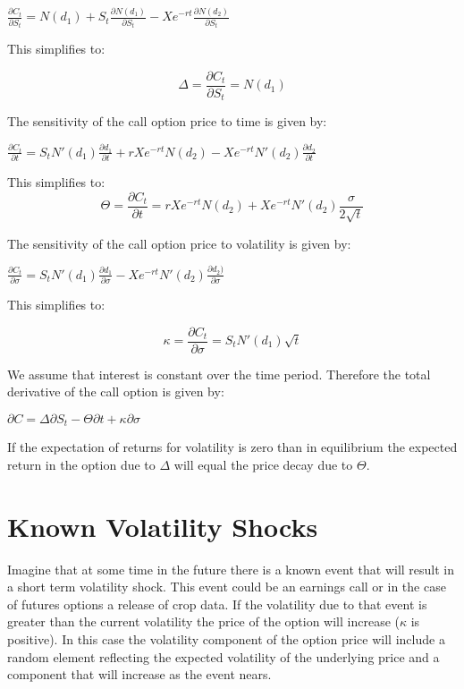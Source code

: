 \documentclass{article}
\begin{document}
$
\frac{\partial{C_{t}}}{\partial{S_{t}}}=N(d_{1})+S_{t}\frac{\partial{N(d_{1})}}{\partial{S_{t}}}-Xe^{-rt}\frac{\partial{N(d_{2})}}{\partial{S_{t}}}
$

This simplifies to:

\begin{equation}
\Delta=\frac{\partial{C_{t}}}{\partial{S_{t}}}=N(d_{1})
\end{equation}


The sensitivity of the call option price to time is given by:

$\frac{\partial{C_{t}}}{\partial{t}}=S_{t}N'(d_{1})\frac{\partial{d_{1}}}{\partial{t}}+rXe^{-rt}N(d_{2})-Xe^{-rt}N'(d_{2})\frac{\partial{d_{2}}}{\partial{t}}$

This simplifies to:
\begin{equation}
\Theta=\frac{\partial{C_{t}}}{\partial{t}}=rXe^{-rt}N(d_{2})+Xe^{-rt}N'(d_{2})\frac{\sigma}{2\sqrt{t}}
\end{equation}

The sensitivity of the call option price to volatility is given by:

$\frac{\partial{C_{t}}}{\partial{\sigma}}=S_{t}N'(d_{1})\frac{\partial{d_{1}}}{\partial{\sigma}}-Xe^{-rt}N'(d_{2})\frac{\partial{d_{2})}}{\partial{\sigma}}$

This simplifies to:

\begin{equation}
\kappa=\frac{\partial{C_{t}}}{\partial{\sigma}}=S_{t}N'(d_{1})\sqrt{t}
\end{equation}

We assume that interest is constant over the time period. Therefore the total derivative of the call option is given by:

$\partial{C}=\Delta\partial{S_{t}}-\Theta\partial{t}+\kappa\partial{\sigma}$

If the expectation of returns for volatility is zero than in equilibrium the expected return in the option due to $\Delta$ will equal the price decay due to $\Theta$.

\section{Known Volatility Shocks}

Imagine that at some time in the future there is a known event that will result in a short term volatility shock.  This event could be an earnings call or in the case of futures options a release of crop data.  If the volatility due to that event is greater than the current volatility the price of the option will increase ($\kappa$ is positive).  In this case the volatility component of the option price will include a random element reflecting the expected volatility of the underlying price and a component that will increase as the event nears.  
\end{document}
